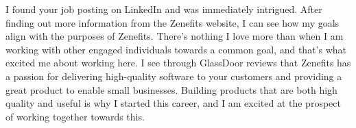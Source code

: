 I found your job posting on LinkedIn and was immediately intrigued.
After finding out more information from the Zenefits website, I can see how my goals align with the purposes of Zenefits.
There's nothing I love more than when I am working with other engaged individuals towards a common goal, and that's what excited me about working here.  
I see through GlassDoor reviews that Zenefits has a passion for delivering high-quality software to your customers and providing a great product to enable small businesses. 
Building products that are both high quality and useful is why I started this career, and I am excited at the prospect of working together towards this.
